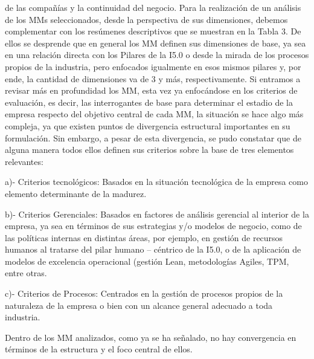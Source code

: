 \documentclass{article}
\begin{document}
de las compañías y la continuidad del negocio. Para la realización de un
análisis de los MMs seleccionados, desde la perspectiva de sus
dimensiones, debemos complementar con los resúmenes descriptivos que se
muestran en la Tabla 3. De ellos se desprende que en general los MM
definen sus dimensiones de base, ya sea en una relación directa con los
Pilares de la I5.0 o desde la mirada de los procesos propios de la
industria, pero enfocados igualmente en esos mismos pilares y, por ende,
la cantidad de dimensiones va de 3 y más, respectivamente. Si entramos a
revisar más en profundidad los MM, esta vez ya enfocándose en los
criterios de evaluación, es decir, las interrogantes de base para
determinar el estadio de la empresa respecto del objetivo central de
cada MM, la situación se hace algo más compleja, ya que existen puntos
de divergencia estructural importantes en su formulación. Sin embargo, a
pesar de esta divergencia, se pudo constatar que de alguna manera todos
ellos definen sus criterios sobre la base de tres elementos relevantes:

a)- Criterios tecnológicos: Basados en la situación tecnológica de la
empresa como elemento determinante de la madurez.

b)- Criterios Gerenciales: Basados en factores de análisis gerencial al
interior de la empresa, ya sea en términos de sus estrategias y/o
modelos de negocio, como de las políticas internas en distintas áreas,
por ejemplo, en gestión de recursos humanos al tratarse del pilar humano
-- céntrico de la I5.0, o de la aplicación de modelos de excelencia
operacional (gestión Lean, metodologías Agiles, TPM, entre otras.

c)- Criterios de Procesos: Centrados en la gestión de procesos propios
de la naturaleza de la empresa o bien con un alcance general adecuado a
toda industria.

Dentro de los MM analizados, como ya se ha señalado, no hay convergencia
en términos de la estructura y el foco central de ellos.
\end{document}
